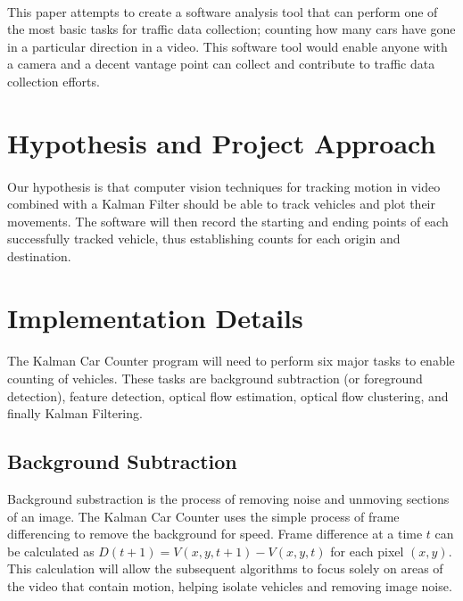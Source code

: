 \documentclass{article} %
\begin{document}
\paragraph{} This paper attempts to create a software analysis tool that can perform one of the most basic tasks for traffic data collection; counting how many cars have gone in a particular direction in a video. This software tool would enable anyone with a camera and a decent vantage point can collect and contribute to traffic data collection efforts. 

\section{Hypothesis and Project Approach}
\label{headings}
\paragraph{}Our hypothesis is that computer vision techniques for tracking motion in video combined with a Kalman Filter should be able to track vehicles and plot their movements. The software will then record the starting and ending points of each successfully tracked vehicle, thus establishing counts for each origin and destination.


\section{Implementation Details}
\label{headings}
\paragraph{}The Kalman Car Counter program will need to perform six major tasks to enable counting of vehicles. These tasks are background subtraction (or foreground detection), feature detection, optical flow estimation, optical flow clustering, and finally Kalman Filtering.
\subsection{Background Subtraction}
Background substraction is the process of removing noise and unmoving sections of an image.  The Kalman Car Counter uses the simple process of frame differencing to remove the background for speed. Frame difference at a time $t$ can be calculated as 
$ D(t+1) = V(x,y,t+1) - V(x,y,t) $ for each pixel $(x,y)$. \cite{Birgi09}
This calculation will allow the subsequent algorithms to focus solely on areas of the video that contain motion, helping isolate vehicles and removing image noise.
\end{document}
